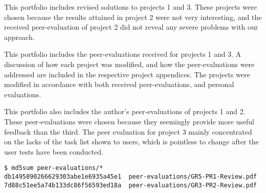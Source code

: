 
This portfolio includes revised solutions to projects 1 and 3. These projects
were chosen because the results attained in project 2 were not very
interesting, and the received peer-evaluation of project 2 did not reveal any
severe problems with our approach.

This portfolio includes the peer-evaluations received for projects 1 and 3. A
discussion of how each project was modified, and how the peer-evaluations were
addressed are included in the respective project appendices. The projects were
modified in accordance with both received peer-evaluations, and personal
evaluations.

This portfolio also includes the author's peer-evaluations of projects 1 and 2.
These peer-evaluations were chosen because they seemingly provide more useful
feedback than the third. The peer evaluation for project 3 mainly concentrated
on the lacks of the task list shown to users, which is pointless to change
after the user tests have been conducted.

\begin{lstlisting}
$ md5sum peer-evaluations/*
db1495890266629303abe1e6935a45e1  peer-evaluations/GR5-PR1-Review.pdf
7d88c51ee5a74b133dc86f56593ed18a  peer-evaluations/GR3-PR2-Review.pdf
\end{lstlisting}

